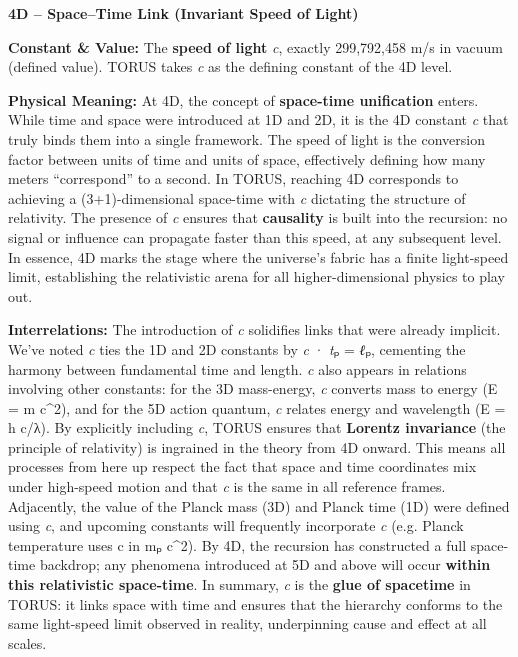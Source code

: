 \documentclass[]{article}
\begin{document}
\textbf{4D -- Space--Time Link (Invariant Speed of Light)}

\textbf{Constant \& Value:} The \textbf{speed of light} \emph{c},
exactly 299,792,458 m/s in vacuum (defined value)​. TORUS takes \emph{c}
as the defining constant of the 4D level.

\textbf{Physical Meaning:} At 4D, the concept of \textbf{space-time
unification} enters. While time and space were introduced at 1D and 2D,
it is the 4D constant \emph{c} that truly binds them into a single
framework. The speed of light is the conversion factor between units of
time and units of space​, effectively defining how many meters
``correspond'' to a second. In TORUS, reaching 4D corresponds to
achieving a (3+1)-dimensional space-time with \emph{c} dictating the
structure of relativity. The presence of \emph{c} ensures that
\textbf{causality} is built into the recursion: no signal or influence
can propagate faster than this speed, at any subsequent level​. In
essence, 4D marks the stage where the universe's fabric has a finite
light-speed limit, establishing the relativistic arena for all
higher-dimensional physics to play out.

\textbf{Interrelations:} The introduction of \emph{c} solidifies links
that were already implicit. We've noted \emph{c} ties the 1D and 2D
constants by \emph{c} · \emph{t}ₚ = \emph{ℓ}ₚ​, cementing the harmony
between fundamental time and length. \emph{c} also appears in relations
involving other constants: for the 3D mass-energy, \emph{c} converts
mass to energy (E = m c\^{}2), and for the 5D action quantum, \emph{c}
relates energy and wavelength (E = h c/λ)​. By explicitly including
\emph{c}, TORUS ensures that \textbf{Lorentz invariance} (the principle
of relativity) is ingrained in the theory from 4D onward. This means all
processes from here up respect the fact that space and time coordinates
mix under high-speed motion and that \emph{c} is the same in all
reference frames. Adjacently, the value of the Planck mass (3D) and
Planck time (1D) were defined using \emph{c}, and upcoming constants
will frequently incorporate \emph{c} (e.g. Planck temperature uses c in
mₚ c\^{}2). By 4D, the recursion has constructed a full space-time
backdrop; any phenomena introduced at 5D and above will occur
\textbf{within this relativistic space-time}​. In summary, \emph{c} is
the \textbf{glue of spacetime} in TORUS: it links space with time and
ensures that the hierarchy conforms to the same light-speed limit
observed in reality, underpinning cause and effect at all scales.
\end{document}
